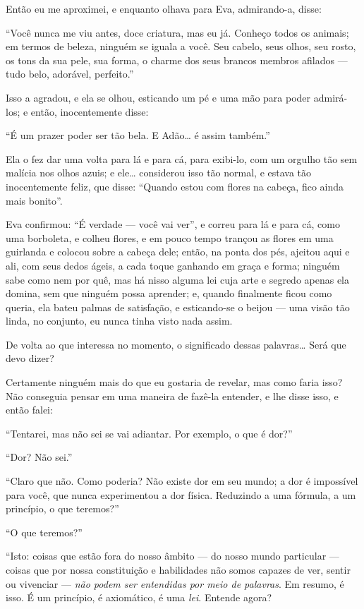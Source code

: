 Então eu me aproximei, e enquanto olhava para Eva, admirando-a, disse:

“Você nunca me viu antes, doce criatura, mas eu já. Conheço todos os
animais; em termos de beleza, ninguém se iguala a você. Seu cabelo,
seus olhos, seu rosto, os tons da sua pele, sua forma, o charme dos seus
brancos membros afilados --- tudo belo, adorável, perfeito.”

Isso a agradou, e ela se olhou, esticando um pé e uma mão para poder
admirá-los; e então, inocentemente disse:

“É um prazer poder ser tão bela. E Adão\ldots{} é assim também.”

Ela o fez dar uma volta para lá e para cá, para
exibi-lo, com um orgulho tão sem malícia nos olhos
azuis; e ele\ldots{} considerou isso tão normal, e estava tão
inocentemente feliz, que disse: ``Quando estou com flores na
cabeça, fico ainda mais bonito''.

Eva confirmou: ``É verdade --- você vai ver'', e
correu para lá e para cá, como uma borboleta, e colheu
flores, e em pouco tempo trançou as flores em uma guirlanda e colocou
sobre a cabeça dele; então, na ponta dos pés, ajeitou aqui e ali, com seus
dedos ágeis, a cada toque ganhando em graça e forma; ninguém sabe como nem
por quê, mas há nisso alguma lei cuja arte e segredo apenas ela domina,
sem que ninguém possa aprender; e, quando finalmente ficou como queria,
ela bateu palmas de satisfação, e esticando-se o beijou
--- uma visão tão linda, no conjunto, eu nunca
tinha visto nada assim.

De volta ao que interessa no momento, o significado dessas palavras\ldots{}
Será que devo dizer?

Certamente ninguém mais do que eu gostaria de revelar, mas como faria isso? Não
conseguia pensar em uma maneira de fazê-la entender, e lhe disse isso, e
então falei:

“Tentarei, mas não sei se vai adiantar. Por exemplo, o que é dor?”

“Dor? Não sei.”

“Claro que não. Como poderia? Não existe dor em seu mundo; a dor é
impossível para você, que nunca experimentou a dor física. Reduzindo a
uma fórmula, a um princípio, o que teremos?”

“O que teremos?”

“Isto: coisas que estão fora do nosso âmbito --- do nosso mundo particular ---
coisas que por nossa constituição e habilidades não
somos capazes de ver, sentir ou vivenciar --- \textit{não podem ser
entendidas por meio de palavras}. Em resumo, é isso. É um
princípio, é axiomático, é uma \textit{lei}. Entende agora?

